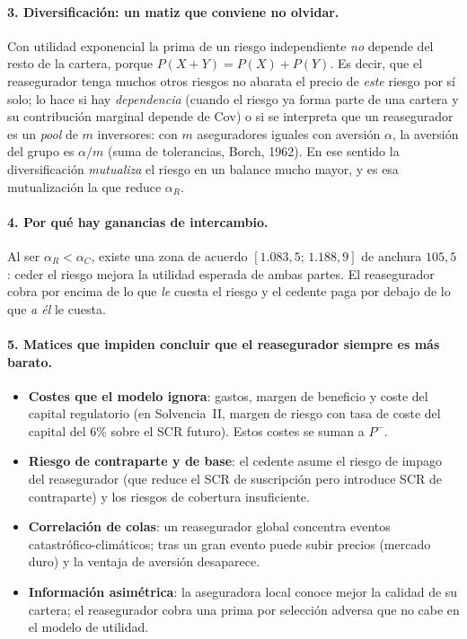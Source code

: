 \documentclass[a4paper,12pt]{article}
\begin{document}
\paragraph{3. Diversificaci\'on: un matiz que conviene no olvidar.} Con utilidad exponencial la prima de un riesgo independiente \emph{no} depende del resto de la cartera, porque $P(X+Y)=P(X)+P(Y)$. Es decir, que el reasegurador tenga muchos otros riesgos no abarata el precio de \emph{este} riesgo por s\'i solo; lo hace si hay \emph{dependencia} (cuando el riesgo ya forma parte de una cartera y su contribuci\'on marginal depende de $\mathrm{Cov}$) o si se interpreta que un reasegurador es un \emph{pool} de $m$ inversores: con $m$ aseguradores iguales con aversi\'on $\alpha$, la aversi\'on del grupo es $\alpha/m$ (suma de tolerancias, Borch, 1962). En ese sentido la diversificaci\'on \emph{mutualiza} el riesgo en un balance mucho mayor, y es esa mutualizaci\'on la que reduce $\alpha_R$.

\paragraph{4. Por qu\'e hay ganancias de intercambio.} Al ser $\alpha_R<\alpha_C$, existe una zona de acuerdo $[1.083{,}5;\,1.188{,}9]$ de anchura $105{,}5$: ceder el riesgo mejora la utilidad esperada de ambas partes. El reasegurador cobra por encima de lo que \emph{le} cuesta el riesgo y el cedente paga por debajo de lo que \emph{a \'el} le cuesta.

\paragraph{5. Matices que impiden concluir que el reasegurador siempre es m\'as barato.}
\begin{itemize}[leftmargin=*,itemsep=1pt]
\item \textbf{Costes que el modelo ignora}: gastos, margen de beneficio y coste del capital regulatorio (en Solvencia~II, margen de riesgo con tasa de coste del capital del $6\%$ sobre el SCR futuro). Estos costes se suman a $P^-$.
\item \textbf{Riesgo de contraparte y de base}: el cedente asume el riesgo de impago del reasegurador (que reduce el SCR de suscripci\'on pero introduce SCR de contraparte) y los riesgos de cobertura insuficiente.
\item \textbf{Correlaci\'on de colas}: un reasegurador global concentra eventos catastr\'ofico-clim\'aticos; tras un gran evento puede subir precios (mercado duro) y la ventaja de aversi\'on desaparece.
\item \textbf{Informaci\'on asim\'etrica}: la aseguradora local conoce mejor la calidad de su cartera; el reasegurador cobra una prima por selecci\'on adversa que no cabe en el modelo de utilidad.
\end{itemize}
\end{document}
